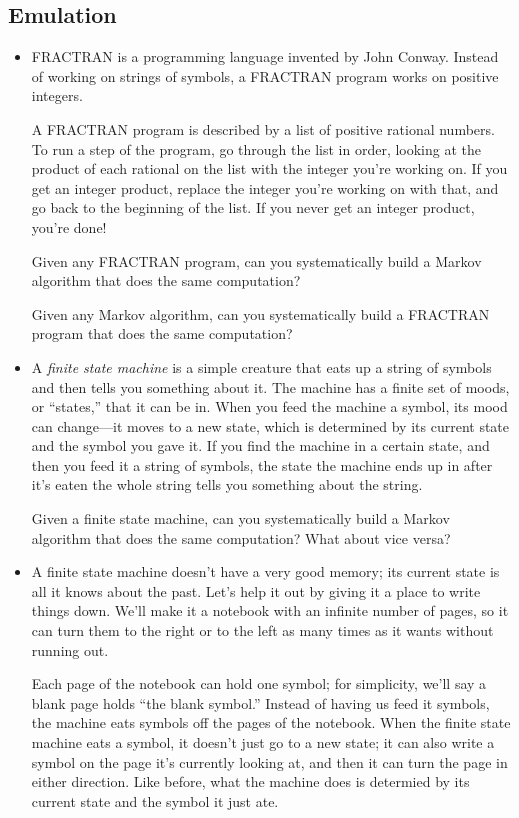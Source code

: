 \documentclass{article}
\newcommand*\proveit{\item[\manimpossiblecube]}
\begin{document}
\subsection*{Emulation}
\begin{itemize}
\proveit FRACTRAN is a programming language invented by John Conway. Instead of working on strings of symbols, a FRACTRAN program works on positive integers.

A FRACTRAN program is described by a list of positive rational numbers. To run a step of the program, go through the list in order, looking at the product of each rational on the list with the integer you're working on. If you get an integer product, replace the integer you're working on with that, and go back to the beginning of the list. If you never get an integer product, you're done!

Given any FRACTRAN program, can you systematically build a Markov algorithm that does the same computation?

Given any Markov algorithm, can you systematically build a FRACTRAN program that does the same computation?
\proveit
A {\em finite state machine} is a simple creature that eats up a string of symbols and then tells you something about it. The machine has a finite set of moods, or ``states,'' that it can be in. When you feed the machine a symbol, its mood can change---it moves to a new state, which is determined by its current state and the symbol you gave it. If you find the machine in a certain state, and then you feed it a string of symbols, the state the machine ends up in after it's eaten the whole string tells you something about the string.

Given a finite state machine, can you systematically build a Markov algorithm that does the same computation? What about vice versa?
\proveit
A finite state machine doesn't have a very good memory; its current state is all it knows about the past. Let's help it out by giving it a place to write things down. We'll make it a notebook with an infinite number of pages, so it can turn them to the right or to the left as many times as it wants without running out. 

Each page of the notebook can hold one symbol; for simplicity, we'll say a blank page holds ``the blank symbol.'' Instead of having us feed it symbols, the machine eats symbols off the pages of the notebook. When the finite state machine eats a symbol, it doesn't just go to a new state; it can also write a symbol on the page it's currently looking at, and then it can turn the page in either direction. Like before, what the machine does is determied by its current state and the symbol it just ate.


\end{itemize}
\end{document}
